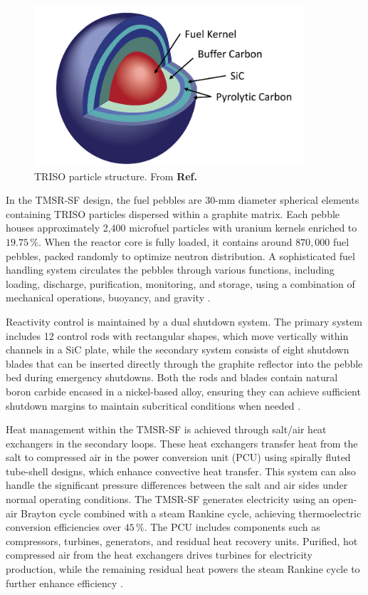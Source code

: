 \begin{figure}[ht]
    \centering
    \includegraphics[scale=0.5]{Kap6/Figures_Kap6/TRISO_particle.png}
    \caption{TRISO particle structure. From \textbf{Ref.} \cite{IAEA_TRISO_REPORT}}
    \label{fig:TRISO}
\end{figure}

In the TMSR-SF design, the fuel pebbles are 30-mm diameter spherical elements containing TRISO particles dispersed within a graphite matrix. Each pebble houses approximately 2,400 microfuel particles with uranium kernels enriched to \(19.75 \, \%\). When the reactor core is fully loaded, it contains around \(870,000\) fuel pebbles, packed randomly to optimize neutron distribution. A sophisticated fuel handling system circulates the pebbles through various functions, including loading, discharge, purification, monitoring, and storage, using a combination of mechanical operations, buoyancy, and gravity \cite{TMSR_book}.

Reactivity control is maintained by a dual shutdown system. The primary system includes 12 control rods with rectangular shapes, which move vertically within channels in a SiC plate, while the secondary system consists of eight shutdown blades that can be inserted directly through the graphite reflector into the pebble bed during emergency shutdowns. Both the rods and blades contain natural boron carbide encased in a nickel-based alloy, ensuring they can achieve sufficient shutdown margins to maintain subcritical conditions when needed \cite{TMSR_book}.

Heat management within the TMSR-SF is achieved through salt/air heat exchangers in the secondary loops. These heat exchangers transfer heat from the salt to compressed air in the power conversion unit (PCU) using spirally fluted tube-shell designs, which enhance convective heat transfer. This system can also handle the significant pressure differences between the salt and air sides under normal operating conditions. The TMSR-SF generates electricity using an open-air Brayton cycle combined with a steam Rankine cycle, achieving thermoelectric conversion efficiencies over \(45 \, \%\). The PCU includes components such as compressors, turbines, generators, and residual heat recovery units. Purified, hot compressed air from the heat exchangers drives turbines for electricity production, while the remaining residual heat powers the steam Rankine cycle to further enhance efficiency \cite{TMSR_book}.

